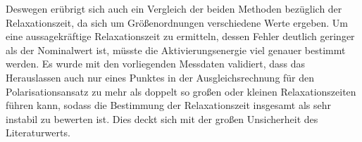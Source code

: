 Deswegen erübrigt sich auch ein Vergleich der beiden Methoden bezüglich der Relaxationszeit, da sich um Größenordnungen verschiedene Werte ergeben. Um eine aussagekräftige Relaxationszeit zu ermitteln, dessen Fehler deutlich geringer als der Nominalwert ist, müsste die Aktivierungsenergie viel genauer bestimmt werden. Es wurde mit den vorliegenden Messdaten validiert, dass das Herauslassen auch nur eines Punktes in der Ausgleichsrechnung für den Polarisationsansatz zu mehr als doppelt so großen oder kleinen Relaxationszeiten führen kann, sodass die Bestimmung der Relaxationszeit insgesamt als sehr instabil zu bewerten ist. Dies deckt sich mit der großen Unsicherheit des Literaturwerts.
